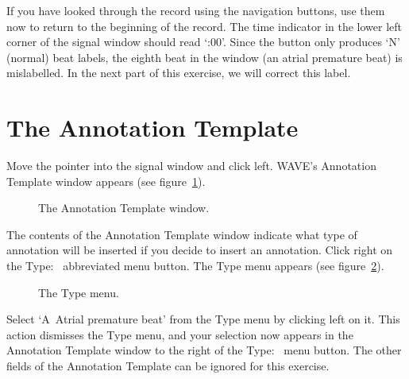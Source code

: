 \documentclass[twoside]{book}
\newcommand{\keycap}[1]{\cornersize{.5}\Ovalbox{\small\sf #1}}
\newcommand{\button}[1]{\cornersize{2}\ovalbox{\rule[-.3mm]{0cm}{2.5mm}\small\sf ~#1~}}
\newcommand{\amenubutton}[1]{{\sf #1}~\keycap{\ensuremath{\nabla}}}
\newcommand{\WAVE}{{\sf WAVE}\xspace}
\begin{document}
If you have looked through the record using the navigation buttons,
use them now to return to the beginning of the record.  The time
indicator in the lower left corner of the signal window should read
`{:00}'.  Since the \button{Mark QRS complexes} button only
produces `{\sf N}' (normal) beat labels, the eighth beat in the window
(an atrial premature beat) is mislabelled.  In the next part of this
exercise, we will correct this label.

\section{The {\sf Annotation Template}}
Move the pointer into the signal window and click left.  \WAVE{}'s
{\sf Annotation Template} window appears (see
figure~\ref{fig:annotation-template}).
\begin{figure}
\centerline{}
\caption{The {\sf Annotation Template} window.}
\begin{htmlonly}
\end{htmlonly}
\begin{latexonly}
\end{latexonly}
\label{fig:annotation-template}
\end{figure}
The contents of the {\sf Annotation Template} window indicate what
type of annotation will be inserted if you decide to insert an
annotation.  Click right on the \amenubutton{Type:} abbreviated
menu button.  The {\sf Type} menu
appears (see figure~\ref{fig:type-menu}).
\begin{figure}
\centerline{}
\caption{The {\sf Type} menu.}
\label{fig:type-menu}
\begin{htmlonly}
\end{htmlonly}
\begin{latexonly}
\end{latexonly}
\end{figure}
Select `{\sf A~Atrial premature beat}' from the {\sf Type} menu by
clicking left on it.  This action dismisses the {\sf Type} menu, and
your selection now appears in the {\sf Annotation Template} window to
the right of the \amenubutton{Type:} menu button.  The other
fields of the {\sf Annotation Template} can be ignored for this exercise.
\end{document}

